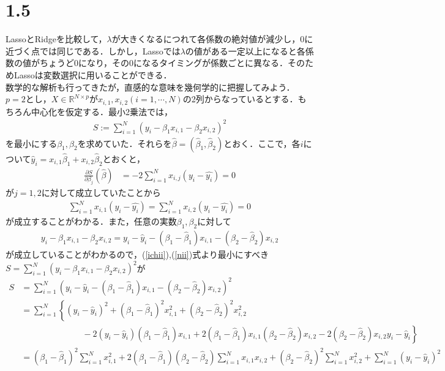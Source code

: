 \documentclass{jsarticle}
\theoremstyle{definition}
\theoremstyle{mystyle} %
\begin{document}
\large
\section*{1.5}
LassoとRidgeを比較して，$\lambda$が大きくなるにつれて各係数の絶対値が減少し，$0$に近づく点では同じである．しかし，Lassoでは$\lambda$の値がある一定以上になると各係数の値がちょうど$0$になり，その$0$になるタイミングが係数ごとに異なる．そのためLassoは変数選択に用いることができる．\\

数学的な解析も行ってきたが，直感的な意味を幾何学的に把握してみよう．\\

$p=2$とし，$X\in \mathbb{R}^{N\times p}$が$x_{i,1},x_{i,2}(i=1,\cdots,N)$の2列からなっているとする．もちろん中心化を仮定する．最小2乗法では，
\begin{align*}
S:=\sum_{i=1}^N (y_i-\beta_1 x_{i,1}-\beta_2 x_{i,2})^2
\end{align*}
を最小にする$\beta_1,\beta_2$を求めていた．それらを$\hat{\beta}=(\hat{\beta}_1,\hat{\beta}_2)$とおく．ここで，各$i$について$\hat{y}_i = x_{i,1}\hat{\beta}_1+x_{i,2}\hat{\beta}_2$とおくと，
\begin{align*}
\frac{\partial S}{\partial \beta_j}(\hat{\beta}) &= -2\sum_{i=1}^Nx_{i,j}(y_i-\hat{y_i})=0
\end{align*}
が$j=1,2$に対して成立していたことから
\begin{align}
\label{ichii}
\sum_{i=1}^Nx_{i,1}(y_i-\hat{y_i})=\sum_{i=1}^Nx_{i,2}(y_i-\hat{y_i})=0
\end{align}
が成立することがわかる．また，任意の実数$\beta_1,\beta_2$に対して
\begin{align}
\label{nii}
y_i-\beta_1x_{i,1}-\beta_2x_{i,2} = y_i-\hat{y}_i-(\beta_1-\hat{\beta}_1)x_{i,1}-(\beta_2-\hat{\beta}_2)x_{i,2}
\end{align}
が成立していることがわかるので，(\ref{ichii}),(\ref{nii})式より最小にすべき$S=\sum_{i=1}^N (y_i-\beta_1 x_{i,1}-\beta_2 x_{i,2})^2$が
\begin{equation}
\begin{split}
\label{kei}
S &= \sum_{i=1}^N( y_i-\hat{y}_i-(\beta_1-\hat{\beta}_1)x_{i,1}-(\beta_2-\hat{\beta}_2)x_{i,2})^2\\
&=\sum_{i=1}^N\left\{(y_i-\hat{y}_i)^2+(\beta_1-\hat{\beta}_1)^2x_{i,1}^2+(\beta_2-\hat{\beta}_2)^2x_{i,2}^2\right.\\
&\hspace{3cm} - \left.2(y_i-\hat{y}_i)(\beta_1-\hat{\beta}_1)x_{i,1}+2(\beta_1-\hat{\beta}_1)x_{i,1}(\beta_2-\hat{\beta}_2)x_{i,2}-2(\beta_2-\hat{\beta}_2)x_{i,2}y_i-\hat{y}_i\right\}\\
&=(\beta_1-\hat{\beta}_1)^2\sum_{i=1}^Nx_{i,1}^2+2(\beta_1-\hat{\beta}_1)(\beta_2-\hat{\beta}_2)\sum_{i=1}^Nx_{i,1}x_{i,2}+(\beta_2-\hat{\beta}_2)^2\sum_{i=1}^N x_{i,2}^2+\sum_{i=1}^N (y_i-\hat{y}_i)^2
\end{split}
\end{equation}
\end{document}
